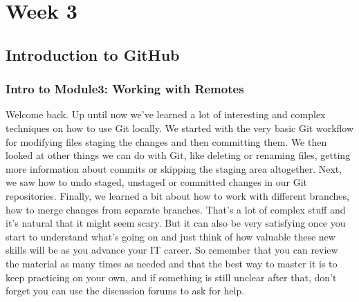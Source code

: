 %
%
%
\chapter{Week 3}
\label{intro3} %


\section{Introduction to GitHub} \label{W301}

	\subsection{Intro to Module3: Working with Remotes} \label{W301a}

	Welcome back. Up until now we've learned a lot of interesting and complex techniques on how to use Git locally. We started with the very basic Git workflow for modifying files staging the changes and then committing them. We then looked at other things we can do with Git, like deleting or renaming files, getting more information about commits or skipping the staging area altogether. Next, we saw how to undo staged, unstaged or committed changes in our Git repositories. Finally, we learned a bit about how to work with different branches, how to merge changes from separate branches. That's a lot of complex stuff and it's natural that it might seem scary. But it can also be very satisfying once you start to understand what's going on and just think of how valuable these new skills will be as you advance your IT career. 
	So remember that you can review the material as many times as needed and that the best way to master it is to keep practicing on your own, and if something is still unclear after that, don't forget you can use the discussion forums to ask for help. 
	
